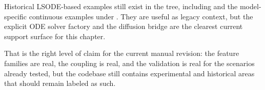 Historical LSODE-based examples still exist in the tree, including
 and the model-specific continuous examples
under . They are
useful as legacy context, but the explicit ODE solver factory and the diffusion
bridge are the clearest current support surface for this chapter.

That is the right level of claim for the current manual revision: the feature
families are real, the coupling is real, and the validation is real for the
scenarios already tested, but the codebase still contains experimental and
historical areas that should remain labeled as such.
